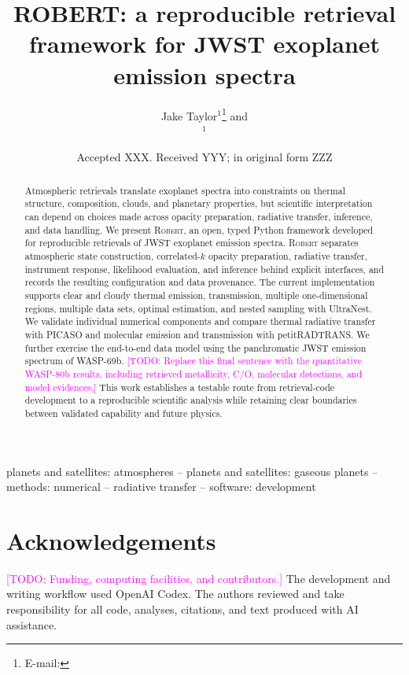 \documentclass[fleqn,usenatbib]{mnras}
\title[ROBERT]{ROBERT: a reproducible retrieval framework for JWST exoplanet emission spectra}
\author[J. Taylor et al.]{
Jake Taylor$^{1}$\thanks{E-mail: \roberttodo{corresponding-author email}}
and \roberttodo{co-authors}\\
$^{1}$\roberttodo{affiliation}
}
\date{Accepted XXX. Received YYY; in original form ZZZ}
\newcommand{\ROBERT}{\textsc{Robert}}
\newcommand{\roberttodo}[1]{\textcolor{magenta}{[TODO: #1]}}
\begin{document}
\label{firstpage}
\pagerange{\pageref{firstpage}--\pageref{lastpage}}
\maketitle

\begin{abstract}
Atmospheric retrievals translate exoplanet spectra into constraints on thermal
structure, composition, clouds, and planetary properties, but scientific
interpretation can depend on choices made across opacity preparation,
radiative transfer, inference, and data handling. We present \ROBERT{}, an
open, typed Python framework developed for reproducible retrievals of JWST
exoplanet emission spectra. \ROBERT{} separates atmospheric state construction,
correlated-$k$ opacity preparation, radiative transfer, instrument response,
likelihood evaluation, and inference behind explicit interfaces, and records
the resulting configuration and data provenance. The current implementation
supports clear and cloudy thermal emission, transmission, multiple one-dimensional
regions, multiple data sets, optimal estimation, and nested sampling with
UltraNest. We validate individual numerical components and compare thermal
radiative transfer with PICASO and molecular emission and transmission with
petitRADTRANS. We further exercise the end-to-end data model using the
panchromatic JWST emission spectrum of WASP-69b. \roberttodo{Replace this final
sentence with the quantitative WASP-80b results, including retrieved metallicity,
C/O, molecular detections, and model evidences.} This work establishes a
testable route from retrieval-code development to a reproducible scientific
analysis while retaining clear boundaries between validated capability and
future physics.
\end{abstract}

\begin{keywords}
planets and satellites: atmospheres -- planets and satellites: gaseous planets
-- methods: numerical -- radiative transfer -- software: development
\end{keywords}







\section*{Acknowledgements}
\roberttodo{Funding, computing facilities, and contributors.} The development
and writing workflow used OpenAI Codex. The authors reviewed and take
responsibility for all code, analyses, citations, and text produced with AI
assistance.
\end{document}
